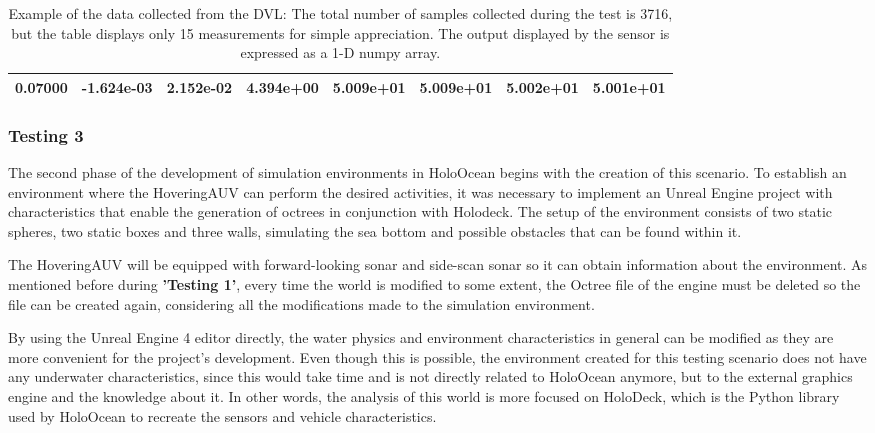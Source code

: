 \documentclass[]{article}
\begin{document}
\begin{table}[H]
\begin{center}
\begin{tabular}{cccccccc}
				\footnotesize 0.07000 &  \footnotesize -1.624e-03 & \footnotesize 2.152e-02 & \footnotesize 4.394e+00 & \footnotesize 5.009e+01 & \footnotesize 5.009e+01 & \footnotesize 5.002e+01 & \footnotesize 5.001e+01 \\
											
				\bottomrule\end{tabular}
			\caption{Example of the data collected from the DVL: The total number of samples collected during the test is 3716, but the table displays only 15 measurements for simple appreciation. The output displayed by the sensor is expressed as a 1-D numpy array.}
		\end{center}
	\end{table}
	
	\subsubsection{Testing 3}
	
	The second phase of the development of simulation environments in HoloOcean begins with the creation of this scenario. To establish an environment where the HoveringAUV can perform the desired activities, it was necessary to implement an Unreal Engine project with characteristics that enable the generation of octrees in conjunction with Holodeck. The setup of the environment consists of two static spheres, two static boxes and three walls, simulating the sea bottom and possible obstacles that can be found within it.
	
	The HoveringAUV will be equipped with forward-looking sonar and side-scan sonar so it can obtain information about the environment. As mentioned before during \textbf{'Testing 1'}, every time the world is modified to some extent, the Octree file of the engine must be deleted so the file can be created again, considering all the modifications made to the simulation environment.
	
	By using the Unreal Engine 4 editor directly, the water physics and environment characteristics in general can be modified as they are more convenient for the project's development. Even though this is possible, the environment created for this testing scenario does not have any underwater characteristics, since this would take time and is not directly related to HoloOcean anymore, but to the external graphics engine and the knowledge about it. In other words, the analysis of this world is more focused on HoloDeck, which is the Python library used by HoloOcean to recreate the sensors and vehicle characteristics.
	
\end{document}
